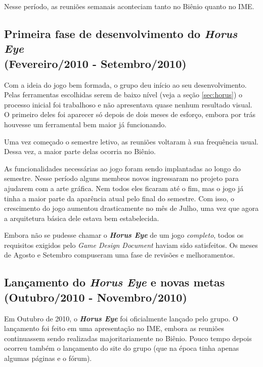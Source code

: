 \documentclass[12pt,onecolumn,a4paper]{article}
\begin{document}
        Nesse período, as reuniões semanais aconteciam tanto no Biênio quanto no IME.
        

    \subsection{Primeira fase de desenvolvimento do \textit{\textbf{Horus Eye}} \\
                {\small(Fevereiro/2010 - Setembro/2010)} }
        Com a ideia do jogo bem formada, o grupo deu início ao seu desenvolvimento. Pelas
        ferramentas escolhidas serem de baixo nível (veja a seção \ref{sec:horus}) o processo
        inicial foi trabalhoso e não apresentava quase nenhum resultado visual. O primeiro deles foi
        aparecer só depois de dois meses de esforço, embora por trás houvesse um ferramental bem
        maior já funcionando.
        
        Uma vez começado o semestre letivo, as reuniões voltaram à sua frequência usual. Dessa vez,
        a maior parte delas ocorria no Biênio.
        
        As funcionalidades necessárias ao jogo foram sendo implantadas ao longo do semestre. Nesse
        período alguns membros novos ingressaram no projeto para ajudarem com a arte gráfica. Nem
        todos eles ficaram até o fim, mas o jogo já tinha a maior parte da aparência atual pelo
        final do semestre. Com isso, o crescimento do jogo aumentou drasticamente no mês de Julho,
        uma vez que agora a arquitetura básica dele estava bem estabelecida.
        
        Embora não se pudesse chamar o \textit{\textbf{Horus Eye}} de um jogo \textit{completo},
        todos os requisitos exigidos pelo \textit{Game Design Document} haviam sido satisfeitos. Os
        meses de Agosto e Setembro compuseram uma fase de revisões e melhoramentos.

    \subsection{Lançamento do \textit{\textbf{Horus Eye}} e novas metas \\
                {\small(Outubro/2010 - Novembro/2010)} }
        Em Outubro de 2010, o \textit{\textbf{Horus Eye}} foi oficialmente lançado pelo grupo. O
        lançamento foi feito em uma apresentação no IME, embora as reuniões continuassem
        sendo realizadas majoritariamente no Biênio. Pouco tempo depois ocorreu também o lançamento
        do site do grupo (que na época tinha apenas algumas páginas e o fórum).
        
\end{document}
